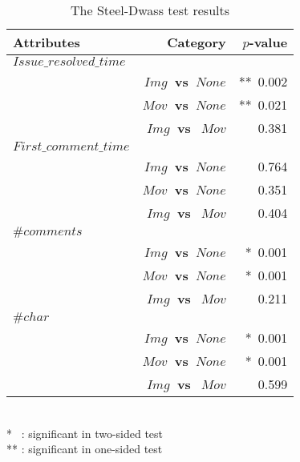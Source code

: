 \begin{table}[t]
  \begin{center}
  \caption{The Steel-Dwass test results}
  \begin{tabular}{l r|r}
    \toprule
    Attributes & Category & $p$-value\\
    \midrule
    $Issue\_resolved\_time$ & & \\
     & \bf{$Img$~vs~$None$} & **~0.002 \\
     & \bf{$Mov$~vs~$None$} & **~0.021 \\
     & \bf{$Img$~vs~$~Mov$} & 0.381 \\
    \midrule
    $First\_comment\_time$ & & \\
     & \bf{$Img$~vs~$None$} & 0.764 \\
     & \bf{$Mov$~vs~$None$} & 0.351 \\
     & \bf{$Img$~vs~$~Mov$} & 0.404 \\
    \midrule
    $\#comments$ & & \\
     & \bf{$Img$~vs~$None$} & *~0.001 \\
     & \bf{$Mov$~vs~$None$} & *~0.001 \\
     & \bf{$Img$~vs~$~Mov$} & 0.211 \\
    \midrule
    $\#char$ & & \\
     & \bf{$Img$~vs~$None$} & *~0.001 \\
     & \bf{$Mov$~vs~$None$} & *~0.001 \\
     & \bf{$Img$~vs~$~Mov$} & 0.599 \\
    \bottomrule
  \end{tabular}\\
  *~ : significant in two-sided test \\
  ** : significant in one-sided test \\
  \label{tab:Steel-Dwass-test}
  \end{center}
\end{table}